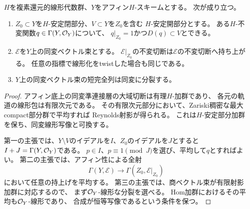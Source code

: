 \begin{lemma}[アフィン底上の同変持上げ]
\label{lem:pg-equivariant-affine-lifting}
$H$を複素還元的線形代数群、$Y$をアフィン$H$-スキームとする。
次が成り立つ。
\begin{enumerate}
\item $Z_0\subset Y$を$H$-安定閉部分、$V\subset Y$を$Z_0$を含む
$H$-安定開部分とする。
ある$H$-不変関数$q\in\Gamma(Y,\mathcal O_Y)$について、
$q|_{Z_0}=1$かつ$D(q)\subset V$とできる。
\item $\mathcal E$を$Y$上の同変ベクトル束とする。
$\mathcal E|_{Z_0}$の不変切断は$\mathcal E$の不変切断へ持ち上がる。
任意の指標で線形化をtwistした場合も同じである。
\item $Y$上の同変ベクトル束の短完全列は同変に分裂する。
\end{enumerate}
\end{lemma}
\begin{proof}
アフィン底上の同変準連接層の大域切断は有理$H$-加群であり、
各元の軌道の線形包は有限次元である。
その有限次元部分において、Zariski稠密な最大compact部分群で平均すれば
Reynolds射影が得られる。
これは$H$-安定部分加群を保ち、同変線形写像と可換する。

第一の主張では、$Y\setminus V$のイデアルを$I$、$Z_0$のイデアルを$J$とすると
$I+J=\Gamma(Y,\mathcal O_Y)$である。
$p\in I$、$p\equiv1\pmod J$を選び、平均して$q$とすればよい。
第二の主張では、アフィン性による全射
\begin{equation}
 \Gamma(Y,\mathcal E)\longrightarrow
 \Gamma(Z_0,\mathcal E|_{Z_0})
 \label{eq:pg-equivariant-restriction-surjection}
\end{equation}
において任意の持上げを平均する。
第三の主張では、商ベクトル束が有限射影加群に対応するので、
まず$\mathcal O_Y$-線形な分裂を選べる。
Hom加群におけるその平均も$\mathcal O_Y$-線形であり、
合成が恒等写像であるという条件を保つ。
\end{proof}

